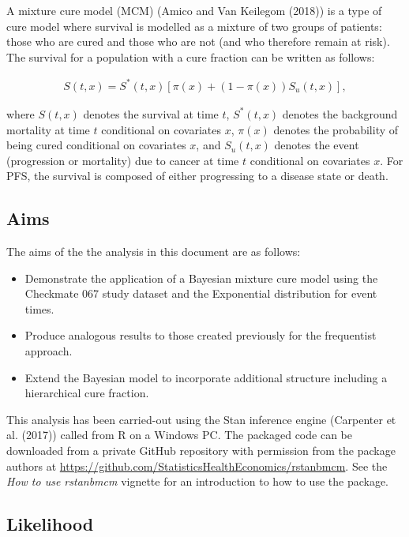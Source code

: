 \documentclass[
]{article}
\providecommand{\tightlist}{%
  \setlength{\itemsep}{0pt}\setlength{\parskip}{0pt}}
\begin{document}
A mixture cure model (MCM) (Amico and Van Keilegom (2018)) is a type of
cure model where survival is modelled as a mixture of two groups of
patients: those who are cured and those who are not (and who therefore
remain at risk). The survival for a population with a cure fraction can
be written as follows:

\begin{align}
\tag{*}
S(t, x) = S^*(t, x)[\pi(x) + (1 − \pi(x))S_u(t, x)],
\end{align}

where \(S(t, x)\) denotes the survival at time \(t\), \(S^*(t, x)\)
denotes the background mortality at time \(t\) conditional on covariates
\(x\), \(\pi(x)\) denotes the probability of being cured conditional on
covariates \(x\), and \(S_u(t, x)\) denotes the event (progression or
mortality) due to cancer at time \(t\) conditional on covariates \(x\).
For PFS, the survival is composed of either progressing to a disease
state or death.

\hypertarget{aims}{%
\subsection{Aims}\label{aims}}

The aims of the the analysis in this document are as follows:

\begin{itemize}
\tightlist
\item
  Demonstrate the application of a Bayesian mixture cure model using the
  Checkmate 067 study dataset and the Exponential distribution for event
  times.
\item
  Produce analogous results to those created previously for the
  frequentist approach.
\item
  Extend the Bayesian model to incorporate additional structure
  including a hierarchical cure fraction.
\end{itemize}

This analysis has been carried-out using the Stan inference engine
(Carpenter et al. (2017)) called from R on a Windows PC. The packaged
code can be downloaded from a private GitHub repository with permission
from the package authors at
\url{https://github.com/StatisticsHealthEconomics/rstanbmcm}. See the
\emph{How to use rstanbmcm} vignette for an introduction to how to use
the package.

\hypertarget{likelihood}{%
\subsection{Likelihood}\label{likelihood}}
\end{document}
